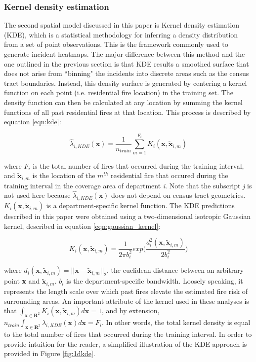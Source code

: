 \documentclass{svjour3}
\begin{document}
\subsubsection{Kernel density estimation}
The second spatial model discussed in this paper is Kernel density estimation (KDE), which is a statistical methodology for inferring a density distribution from a set of point observations. This is the framework commonly used to generate incident heatmaps. The major difference between this method and the one outlined in the previous section is that KDE results  a smoothed surface that does not arise from ``binning" the incidents into discrete areas such as the census tract boundaries. Instead, this density surface is generated by centering a kernel function on each point (i.e. residential fire location) in the training set. The density function can then be calculated at any location by summing the kernel functions of all past residential fires at that location. This process is described by equation \ref{eqn:kde}:

\begin{equation}
  \label{eqn:kde}
  \hat\lambda_{i,KDE}(\textbf{x}) = \frac{1}{n_{train}}\sum_{m=1}^{F_i}K_i(\textbf{x},\tilde{\textbf{x}}_{i,m})
\end{equation}

\noindent where $F_i$ is the total number of fires that occurred during the training interval, and $\tilde{\textbf{x}}_{i,m}$ is the location of the $m^{th}$ residential fire that occured during the training interval in the coverage area of department \textit{i}. Note that the subscript \textit{j} is not used here because $\hat\lambda_{i,KDE}(\textbf{x})$ does not depend on census tract geometries. $K_i(\textbf{x},\tilde{\textbf{x}}_{i,m})$ is a department-specific kernel function. The KDE predictions described in this paper were obtained using a two-dimensional isotropic Gaussian kernel, described in equation \ref{eqn:gaussian_kernel}:


\begin{equation}
  \label{eqn:gaussian_kernel}
  K_i(\textbf{x},\tilde{\textbf{x}}_{i,m}) = \frac{1}{2\pi b_{i}^2}exp\bigg(\frac{d^2_i(\textbf{x},\tilde{\textbf{x}}_{i,m})}{2b_{i}^2}\bigg)
\end{equation}

\noindent where $d_i(\textbf{x},\tilde{\textbf{x}}_{i,m})= ||\textbf{x} - \tilde{\textbf{x}}_{i,m}||_2$, the euclidean distance between an arbitrary point \textbf{x} and $\tilde{\textbf{x}}_{i,m}$. $b_i$ is the department-specific bandwidth. Loosely speaking, it represents the length scale over which past fires elevate the estimated fire risk of surrounding areas. An important attribute of the kernel used in these analyses is that $\int_{\textbf{x} \in \textbf{R}^2}K_i(\textbf{x},\tilde{\textbf{x}}_{i,m})d\textbf{x} = 1$, and by extension, $n_{train}\int_{\textbf{x} \in \textbf{R}^2}\hat\lambda_{i,KDE}(\textbf{x}) d\textbf{x} = F_i$. In other words, the total kernel density is equal to the total number of fires that occurred during the training interval. In order to provide intuition for the reader, a simplified illustration of the KDE approach is provided in Figure \ref{fig:1dkde}.
\end{document}
